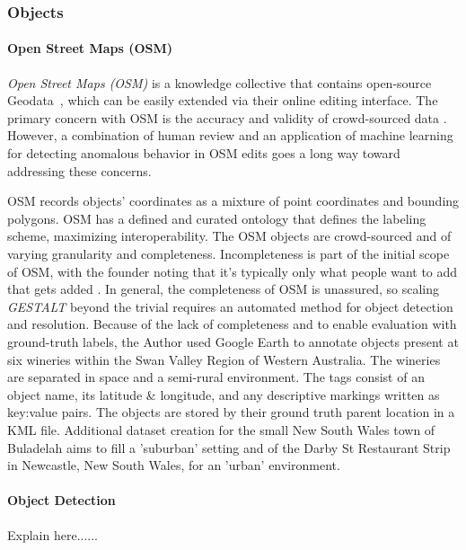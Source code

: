 \subsubsection{Objects}
\paragraph{Open Street Maps (OSM)}
\textit{Open Street Maps (OSM)} is a knowledge collective that contains open-source Geodata~\cite{Haklay2008}, which can be easily extended via their online editing interface.
The primary concern with OSM is the accuracy and validity of crowd-sourced data \cite{VargasMunoz2020}. However, a combination of human review and an application of machine learning for detecting anomalous behavior in OSM edits \cite{Mooney2017} goes a long way toward addressing these concerns. 

OSM records objects' coordinates as a mixture of point coordinates and bounding polygons. 
OSM has a defined and curated ontology that defines the labeling scheme, maximizing interoperability. 
The OSM objects are crowd-sourced and of varying granularity and completeness. Incompleteness is part of the initial scope of OSM, with the founder noting that it's typically only what people want to add that gets added \cite{Haklay2008}.
In general, the completeness of OSM is unassured, so scaling \textit{GESTALT} beyond the trivial requires an automated method for object detection and resolution. 
Because of the lack of completeness and to enable evaluation with ground-truth labels, the Author used Google Earth to annotate objects present at six wineries within the Swan Valley Region of Western Australia. The wineries are separated in space and a semi-rural environment. The tags consist of an object name, its latitude \& longitude, and any descriptive markings written as key:value pairs. The objects are stored by their ground truth parent location in a KML file. Additional dataset creation for the small New South Wales town of Buladelah aims to fill a 'suburban' setting and of the Darby St Restaurant Strip in Newcastle, New South Wales, for an 'urban' environment. 

\paragraph{Object Detection}
Explain here......


